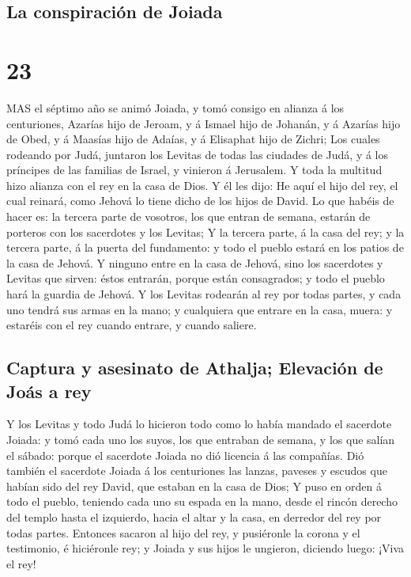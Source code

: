 \hypertarget{la-conspiraciuxf3n-de-joiada}{%
\subsection{La conspiración de
Joiada}\label{la-conspiraciuxf3n-de-joiada}}

\hypertarget{section-22}{%
\section{23}\label{section-22}}

 MAS el séptimo año se animó Joiada, y tomó consigo en
alianza á los centuriones, Azarías hijo de Jeroam, y á Ismael hijo de
Johanán, y á Azarías hijo de Obed, y á Maasías hijo de Adaías, y á
Elisaphat hijo de Zichri;  Los cuales rodeando por Judá,
juntaron los Levitas de todas las ciudades de Judá, y á los príncipes de
las familias de Israel, y vinieron á Jerusalem.  Y toda la
multitud hizo alianza con el rey en la casa de Dios. Y él les dijo: He
aquí el hijo del rey, el cual reinará, como Jehová lo tiene dicho de los
hijos de David.  Lo que habéis de hacer es: la tercera parte
de vosotros, los que entran de semana, estarán de porteros con los
sacerdotes y los Levitas;  Y la tercera parte, á la casa del
rey; y la tercera parte, á la puerta del fundamento: y todo el pueblo
estará en los patios de la casa de Jehová.  Y ninguno entre
en la casa de Jehová, sino los sacerdotes y Levitas que sirven: éstos
entrarán, porque están consagrados; y todo el pueblo hará la guardia de
Jehová.  Y los Levitas rodearán al rey por todas partes, y
cada uno tendrá sus armas en la mano; y cualquiera que entrare en la
casa, muera: y estaréis con el rey cuando entrare, y cuando saliere.

\hypertarget{captura-y-asesinato-de-athalja-elevaciuxf3n-de-jouxe1s-a-rey}{%
\subsection{Captura y asesinato de Athalja; Elevación de Joás a
rey}\label{captura-y-asesinato-de-athalja-elevaciuxf3n-de-jouxe1s-a-rey}}

 Y los Levitas y todo Judá lo hicieron todo como lo había
mandado el sacerdote Joiada: y tomó cada uno los suyos, los que entraban
de semana, y los que salían el sábado: porque el sacerdote Joiada no dió
licencia á las compañías.  Dió también el sacerdote Joiada á
los centuriones las lanzas, paveses y escudos que habían sido del rey
David, que estaban en la casa de Dios;  Y puso en orden á
todo el pueblo, teniendo cada uno su espada en la mano, desde el rincón
derecho del templo hasta el izquierdo, hacia el altar y la casa, en
derredor del rey por todas partes.  Entonces sacaron al
hijo del rey, y pusiéronle la corona y el testimonio, é hiciéronle rey;
y Joiada y sus hijos le ungieron, diciendo luego: ¡Viva el rey!

